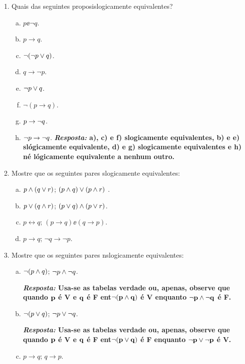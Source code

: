 \begin{enumerate}[{\bf 1.}]
\item Quais das seguintes proposi\coes s\ao logicamente equivalentes?
\begin{enumerate}[a)]
\item $p \ee \lnot q$.
\item $p \to q$.
\item $\lnot(\lnot p \vee q)$.
\item $q \to \lnot p$.
\item $\lnot p \vee q$.
\item $\lnot (p \to q)$.
\item $p \to \lnot q$.
\item $\lnot p \to \lnot q$.
{\bf{\it Resposta:} a), c) e f) s\ao logicamente equivalentes, b) e e) s\ao l\'ogicamente equivalente, d) e g) s\ao logicamente equivalentes e h) n\ao \'e l\'ogicamente equivalente a nenhum outro.}
\end{enumerate}

\item Mostre que os seguintes pares s\ao logicamente equivalentes:
\begin{enumerate}[a)]
\item $p\wedge(q\vee r)$; $(p\wedge q)\vee(p\wedge r)$ .
\item $p\vee(q\wedge r)$; $(p\vee q)\wedge(p\vee r)$.
\item $p\leftrightarrow q$; $(p \to q)\ee(q \to p)$.
\item $p \to q$; $\lnot q \to \lnot p$.
\end{enumerate}

\item Mostre que os seguintes pares n\ao s\ao logicamente equivalentes:
\begin{enumerate}[a)]
\item $\lnot(p \wedge q)$; $\lnot p \wedge \lnot q$. 

{\bf{\it Resposta:} Usa-se as tabelas verdade ou, apenas, observe que quando ${\bf p}$ \'e V e ${\bf q}$ \'e F ent\ao ${\bf \lnot(p \wedge q)}$ \'e V enquanto ${\bf \lnot p \wedge \lnot q}$ \'e F.}

\item $\lnot(p \vee q)$; $\lnot p \vee \lnot q$. 

{\bf{\it Resposta:} Usa-se as tabelas verdade ou, apenas, observe que quando ${\bf p}$ \'e V e ${\bf q}$ \'e F ent\ao ${\bf \lnot(p \vee q)}$ \'e F enquanto ${\bf \lnot p \vee \lnot p}$ \'e V.}

\item $p \to q$; $q \to p$.


\end{enumerate}
\end{enumerate}
